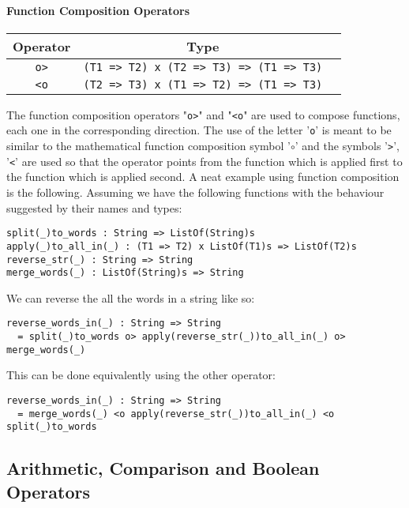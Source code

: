 \documentclass[diploma]{softlab-thesis}
\begin{document}
\paragraph{Function Composition Operators}
\begin{center}
\begin{tabular}{ |c|c|c| }
\hline
Operator & Type
\\
\hline
\hline
\verb|o>| & \verb|(T1 => T2) x (T2 => T3) => (T1 => T3)|
\\
\hline
\verb|<o| & \verb|(T2 => T3) x (T1 => T2) => (T1 => T3)|
\\
\hline
\end{tabular}
\end{center}
The function composition operators "\verb|o>|" and "\verb|<o|" are used to
compose functions, each one in the corresponding direction. The use of the
letter '\verb|o|' is meant to be similar to the mathematical function
composition symbol '\(\circ\)' and the symbols '\verb|>|', '\verb|<|' are used
so that the operator points from the function which is applied first to the
function which is applied second.  A neat example using function composition is
the following. Assuming we have the following functions with the behaviour
suggested by their names and types:
\begin{verbatim}
split(_)to_words : String => ListOf(String)s
apply(_)to_all_in(_) : (T1 => T2) x ListOf(T1)s => ListOf(T2)s
reverse_str(_) : String => String
merge_words(_) : ListOf(String)s => String
\end{verbatim}
We can reverse the all the words in a string like so:
\begin{verbatim}
reverse_words_in(_) : String => String
  = split(_)to_words o> apply(reverse_str(_))to_all_in(_) o> merge_words(_)
\end{verbatim}
This can be done equivalently using the other operator:
\begin{verbatim}
reverse_words_in(_) : String => String
  = merge_words(_) <o apply(reverse_str(_))to_all_in(_) <o split(_)to_words
\end{verbatim}

\newpage

\subsection{Arithmetic, Comparison and Boolean Operators}
\end{document}
